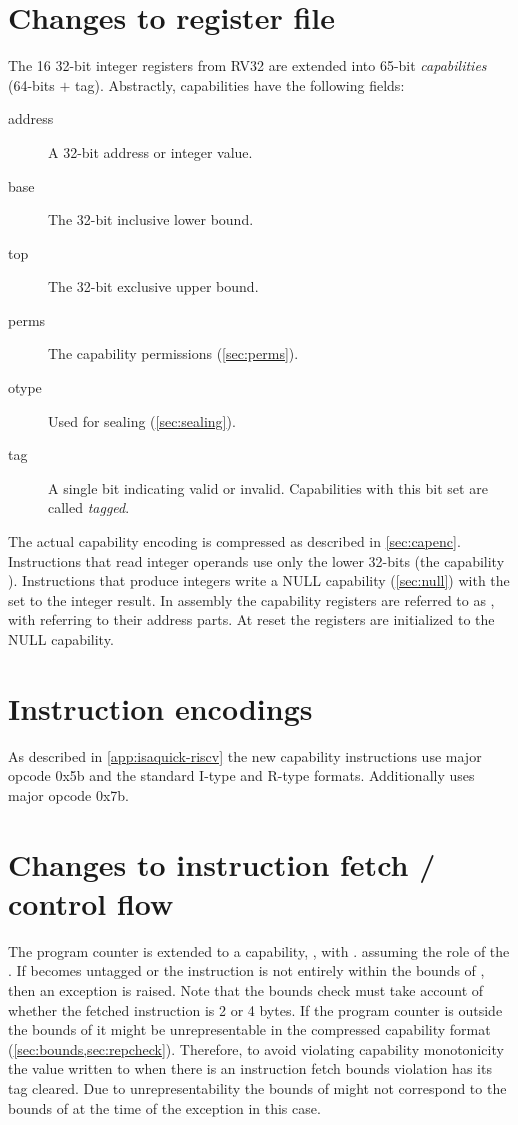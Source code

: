 \section{Changes to register file}

The 16 32-bit integer registers from RV32 are extended into 65-bit \emph{capabilities} (64-bits $+$ tag).
Abstractly, capabilities have the following fields:
\begin{description}
  \item[address] A 32-bit address or integer value.
  \item[base] The 32-bit inclusive lower bound.
  \item[top] The 32-bit exclusive upper bound.
  \item[perms] The capability permissions (\cref{sec:perms}).
  \item[otype] Used for sealing (\cref{sec:sealing}).
  \item[tag] A single bit indicating valid or invalid.
  Capabilities with this bit set are called \emph{tagged}.
\end{description}
The actual capability encoding is compressed as described in \cref{sec:capenc}.
Instructions that read integer operands use only the lower 32-bits (the capability \caddress{}).
Instructions that produce integers write a NULL capability (\cref{sec:null}) with the \caddress{} set to the integer result.
In assembly the capability registers are referred to as , with  referring to their address parts.
At reset the registers are initialized to the NULL capability.

\section{Instruction encodings}

As described in \cref{app:isaquick-riscv} the new capability instructions use major opcode 0x5b and the standard I-type and R-type formats.
Additionally  uses major opcode 0x7b.

\section{Changes to instruction fetch / control flow}

The program counter is extended to a capability, \PCC{}, with \PCC{}.\caddress{} assuming the role of the \PC{}.
If \PCC{} becomes untagged or the instruction is not entirely within the bounds of \PCC{}, then an exception is raised.
Note that the bounds check must take account of whether the fetched instruction is 2 or 4 bytes.
If the program counter is outside the bounds of \PCC{} it might be unrepresentable in the compressed capability format (\cref{sec:bounds,sec:repcheck}).
Therefore, to avoid violating capability monotonicity the value written to \MEPCC{} when there is an instruction fetch bounds violation has its tag cleared.
Due to unrepresentability the bounds of \MEPCC{} might not correspond to the bounds of \PCC{} at the time of the exception in this case.


